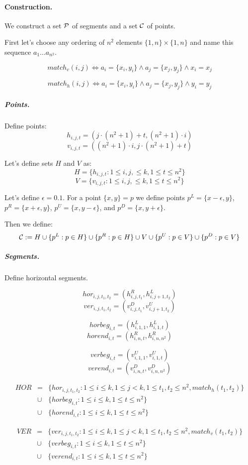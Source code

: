 \paragraph{Construction.}
We construct a set $\mathcal{P}$ of segments and a set $\mathcal{C}$
of points.

First let's choose any ordering of $n^2$ elements
$\{1,n\} \times \{1,n\}$ and name this sequence $a_1 \ldots a_{n^2}$.

$$match_v(i, j) \iff
a_i = \{x_i, y_i\} \land a_j = \{x_j, y_j\} \land x_i = x_j$$

$$match_h(i, j) \iff
a_i = \{x_i, y_i\} \land a_j = \{x_j, y_j\} \land y_i = y_j$$


\subparagraph{Points.}

Define points:
	$$h_{i, j, t} = (j \cdot (n^2+1) + t, (n^2+1) \cdot i)$$
	$$v_{i, j, t} = ((n^2+1) \cdot i, j \cdot (n^2+1) + t)$$
	
Let's define sets $H$ and $V$ as:
$$H = \{h_{i, j, t} : 1 \le i, j, \le k, 1 \le t \le n^2\}$$
$$V = \{v_{i, j, t} : 1 \le i, j, \le k, 1 \le t \le n^2\}$$
	
Let's define $\epsilon = 0.1$.
For a point $\{x, y\} = p$ we define points
$p^{L} = \{x - \epsilon, y\}$,
$p^{R} = \{x + \epsilon, y\}$,
$p^{U} = \{x, y - \epsilon\}$,
and $p^{D} = \{x, y + \epsilon\}$.

Then we define:
$$\mathcal{C} := H \cup \{p^L : p \in H\} \cup \{p^R : p \in H\}
\cup V \cup \{p^U : p \in V\} \cup \{p^D : p \in V\} $$


\subparagraph{Segments.}
Define horizontal segments.

$$hor_{i, j, t_1, t_2} = (h^R_{i,j,t_1}, h^L_{i, j+1, t_2})$$
$$ver_{i, j, t_1, t_2} = (v^D_{i,j,t_1}, v^U_{i, j+1, t_2})$$

$$horbeg_{i, t} = (h^L_{i, 1, 1}, h^L_{i, 1, t})$$
$$horend_{i, t} = (h^R_{i, n, t}, h^R_{i, n, n^2})$$


$$verbeg_{i, t} = (v^U_{i, 1, 1}, v^U_{i, 1, t})$$
$$verend_{i, t} = (v^D_{i, n, t}, v^D_{i, n, n^2})$$

\begin{eqnarray*}
HOR &= &\{hor_{i, j, t_1, t_2} : 1 \le i \le k, 1 \le j < k,
1 \le t_1, t_2 \le n^2, match_h(t_1, t_2)\} \\
&\cup &\{horbeg_{i,t} : 1 \le i \le k, 1 \le t \le n^2\}
\\
&\cup &\{horend_{i,t} : 1 \le i \le k, 1 \le t \le n^2\}
\end{eqnarray*}

\begin{eqnarray*}
VER &= &\{ver_{i, j, t_1, t_2} : 1 \le i \le k, 1 \le j < k,
1 \le t_1, t_2 \le n^2, match_v(t_1, t_2)\} \\
&\cup &\{verbeg_{i,t} : 1 \le i \le k, 1 \le t \le n^2\}
\\
&\cup &\{verend_{i,t} : 1 \le i \le k, 1 \le t \le n^2\}
\end{eqnarray*}

